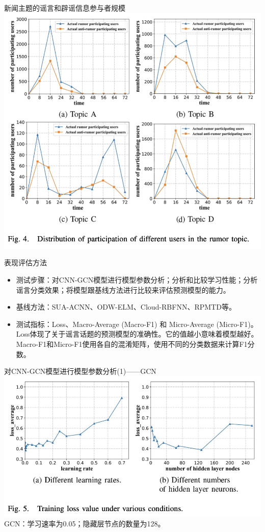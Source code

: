 \documentclass{beamer}
\begin{document}
\begin{frame}{新闻主题的谣言和辟谣信息参与者规模}
	\includegraphics[width=0.8\linewidth]{Assets/图4.png}
\end{frame}

\begin{frame}{表现评估方法}
	\begin{itemize}
		\item 测试步骤：对CNN-GCN模型进行模型参数分析；分析和比较学习性能；分析谣言分类效果；将模型跟基线方法进行比较来评估预测模型的能力。
		\item 基线方法：SUA-ACNN、ODW-ELM、Cloud-RBFNN、RPMTD等。
		\item 测试指标：Loss、Macro-Average (Macro-F1) 和 Micro-Average (Micro-F1)。Loss体现了关于谣言话题的预测模型的准确性。它的值越小意味着模型越好。Macro-F1和Micro-F1使用各自的混淆矩阵，使用不同的分类数据来计算F1分数。
	\end{itemize}
\end{frame}

\begin{frame}{对CNN-GCN模型进行模型参数分析(1)——GCN}
	\includegraphics[width=0.8\linewidth]{Assets/图5.png}\\
	GCN：学习速率为0.05；隐藏层节点的数量为128。
\end{frame}
\end{document}
